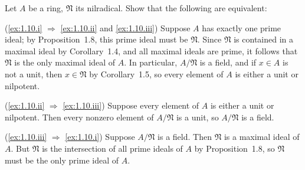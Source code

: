 \begin{exercise}
Let \(A\) be a ring, \(\mathfrak N\) its nilradical.
Show that the following are equivalent:
\end{exercise}

\begin{solution}
(\ref{ex:1.10.i} \(\Rightarrow\) \ref{ex:1.10.ii} and \ref{ex:1.10.iii})
Suppose \(A\) has exactly one prime ideal; by Proposition~1.8, this prime ideal must be \(\mathfrak{N}\).
Since \(\mathfrak{N}\) is contained in a maximal ideal by Corollary~1.4, and all maximal ideals are prime, it follows that \(\mathfrak{N}\) is the only maximal ideal of \(A\).
In particular, \(A / \mathfrak{N}\) is a field, and if \(x \in A\) is not a unit, then \(x \in \mathfrak{N}\) by Corollary~1.5, so every element of \(A\) is either a unit or nilpotent.

(\ref{ex:1.10.ii} \(\Rightarrow\) \ref{ex:1.10.iii})
Suppose every element of \(A\) is either a unit or nilpotent.
Then every nonzero element of \(A / \mathfrak{N}\) is a unit, so \(A / \mathfrak{N}\) is a field.

(\ref{ex:1.10.iii} \(\Rightarrow\) \ref{ex:1.10.i})
Suppose \(A / \mathfrak{N}\) is a field.
Then \(\mathfrak{N}\) is a maximal ideal of \(A\).
But \(\mathfrak{N}\) is the intersection of all prime ideals of \(A\) by Proposition~1.8, so \(\mathfrak{N}\) must be the only prime ideal of \(A\).
\end{solution}